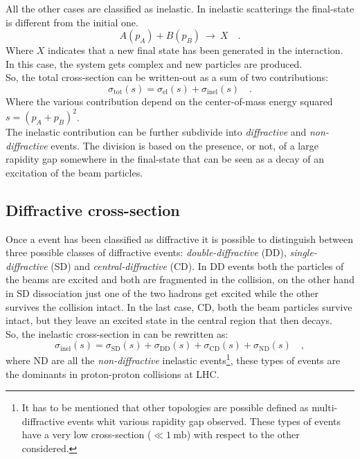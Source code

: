\noindent All the other cases are classified as inelastic. In inelastic scatterings the final-state is different from the initial one.
\begin{equation}
	A(p_A)+B(p_B)\ \longrightarrow \ X\quad.
\end{equation} 
Where $X$ indicates that a new final state has been generated in the interaction. In this case, the system gets complex and new particles are produced. 
\\
So, the total cross-section can be written-out as a sum of two contributions:
\begin{equation}
	\sigma_{\text{tot}}(s) = \sigma_{\text{el}}(s) + \sigma_{\text{inel}}(s)\quad.
	\label{eq:cross_section_elastic_inelastic}
\end{equation}
Where the various contribution depend on the center-of-mass energy squared $s=(p_A+p_B)^2$.
\\
The inelastic contribution can be further subdivide into \textit{diffractive} and \textit{non-diffractive} events. The division is based on the presence, or not, of a large rapidity gap somewhere in the final-state that can be seen as a decay of an excitation of the beam particles.

\subsection{Diffractive cross-section} 

Once a event has been classified as diffractive it is possible to distinguish between three possible classes of diffractive events: \textit{double-diffractive} (DD), \textit{single-diffractive} (SD) and \textit{central-diffractive} (CD). 
In DD events both the particles of the beams are excited and both are fragmented in the collision, on the other hand in SD dissociation just one of the two hadrons get excited while the other survives the collision intact. In the last case, CD, both the beam particles survive intact, but they leave an excited state in the central region that then decays.
\\
So, the inelastic cross-section in  can be rewritten as:
\begin{equation}
	\sigma_{\text{inel}}(s) = \sigma_{\text{SD}}(s)+\sigma_{\text{DD}}(s)+\sigma_{\text{CD}}(s)+\sigma_{\text{ND}}(s)  \quad,
\end{equation}
where ND are all the \textit{non-diffractive} inelastic events\footnote{It has to be mentioned that other topologies are possible defined as multi-diffractive events whit various  rapidity gap observed. These types of events have a very low cross-section ($\ll 1 \ \mathrm{mb}$) with respect to the other considered.}, these types of events are the dominants in proton-proton collisions at LHC.

